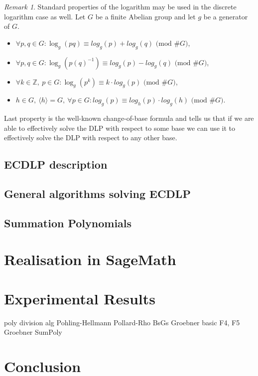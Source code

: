 \documentclass[thesis=M,english]{FITthesis}[2012/10/20]
\theoremstyle{remark}
\newtheorem*{RM}{Remark}
\theoremstyle{definition}
\begin{document}
\begin{RM}
Standard properties of the logarithm may be used in the discrete logarithm case as well. Let $G$ be a finite Abelian group and let $g$ be a generator of $G$.
\begin{itemize}
\item $\forall p, q \in G: \log_g(pq) \equiv log_g(p) + log_g(q) \text{ (mod $\#G$)}$,
\item $\forall p, q \in G: \log_g(p(q)^{-1}) \equiv log_g(p) - log_g(q) \text{ (mod $\#G$)}$,
\item $\forall k \in \mathbb{Z},\ p \in G: \log_g(p^k) \equiv k \cdot log_g(p) \text{ (mod $\#G$)}$,
\item $h \in G,\ \langle h \rangle = G,\ \forall p \in G: log_g(p) \equiv log_h(p) \cdot log_g(h)  \text{ (mod $\#G$)}$.
\end{itemize}
Last property is the well-known change-of-base formula and tells us that if we are able to effectively solve the DLP with respect to some base we can use it to effectively solve the DLP with respect to any other base.
\end{RM}
\section{ECDLP description}
\section{General algorithms solving ECDLP}
\section{Summation Polynomials}
\chapter{Realisation in SageMath}

\chapter{Experimental Results}
poly division alg
Pohling-Hellmann
Pollard-Rho
BsGs
Groebner basic
F4, F5 Groebner
SumPoly 

\chapter{Conclusion}


%
%

\end{document}
